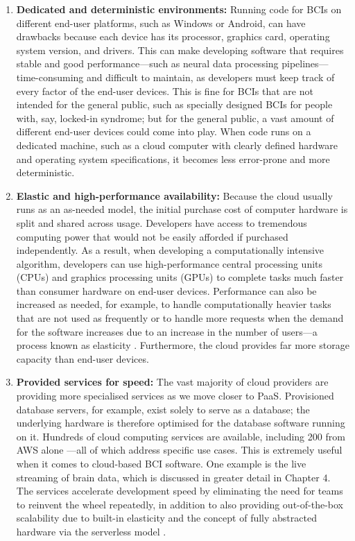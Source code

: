 \begin{enumerate}
  \item \textbf{Dedicated and deterministic environments:} Running code for BCIs on different end-user platforms, such as Windows or Android, can have drawbacks because each device has its processor, graphics card, operating system version, and drivers. This can make developing software that requires stable and good performance—such as neural data processing pipelines—time-consuming and difficult to maintain, as developers must keep track of every factor of the end-user devices. This is fine for BCIs that are not intended for the general public, such as specially designed BCIs for people with, say, locked-in syndrome; but for the general public, a vast amount of different end-user devices could come into play. When code runs on a dedicated machine, such as a cloud computer with clearly defined hardware and operating system specifications, it becomes less error-prone and more deterministic.
  \item \textbf{Elastic and high-performance availability:} Because the cloud usually runs as an as-needed model, the initial purchase cost of computer hardware is split and shared across usage. Developers have access to tremendous computing power that would not be easily afforded if purchased independently. As a result, when developing a computationally intensive algorithm, developers can use high-performance central processing units (CPUs) and graphics processing units (GPUs) to complete tasks much faster than consumer hardware on end-user devices. Performance can also be increased as needed, for example, to handle computationally heavier tasks that are not used as frequently or to handle more requests when the demand for the software increases due to an increase in the number of users—a process known as elasticity \citep{gartner_definition_nodate}. Furthermore, the cloud provides far more storage capacity than end-user devices.

  \item \textbf{Provided services for speed:} The vast majority of cloud providers are providing more specialised services as we move closer to PaaS. Provisioned database servers, for example, exist solely to serve as a database; the underlying hardware is therefore optimised for the database software running on it. Hundreds of cloud computing services are available, including 200 from AWS alone \citep{amazon_web_services_inc_what_nodate}—all of which address specific use cases. This is extremely useful when it comes to cloud-based BCI software. One example is the live streaming of brain data, which is discussed in greater detail in Chapter 4. The services accelerate development speed by eliminating the need for teams to reinvent the wheel repeatedly, in addition to also providing out-of-the-box scalability due to built-in elasticity and the concept of fully abstracted hardware via the serverless model \citep{redhat_what_2022}.
\end{enumerate}


